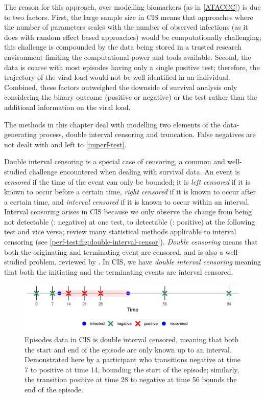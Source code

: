 \documentclass[thesis.tex]{subfiles}
\begin{document}
The reason for this approach, over modelling biomarkers (as in \autoref{ATACCC}) is due to two factors.
First, the large sample size in CIS means that approaches where the number of parameters scales with the number of observed infections (as it does with random effect based approaches) would be computationally challenging; this challenge is compounded by the data being stored in a trusted research environment limiting the computational power and tools available.
Second, the data is coarse with most episodes having only a single positive test; therefore, the trajectory of the viral load would not be well-identified in an individual.
Combined, these factors outweighed the downside of survival analysis only considering the binary outcome (\ie positive or negative) or the test rather than the additional information on the viral load.

The methods in this chapter deal with modelling two elements of the data-generating process, double interval censoring and truncation.
False negatives are not dealt with and left to \autoref{imperf-test}.

Double interval censoring is a special case of censoring, a common and well-studied challenge encountered when dealing with survival data.
An event is \emph{censored} if the time of the event can only be bounded; it is \emph{left censored} if it is known to occur before a certain time, \emph{right censored} if it is known to occur after a certain time, and \emph{interval censored} if it is known to occur within an interval.
Interval censoring arises in CIS because we only observe the change from being not detectable (\ie: negative) at one test, to detectable (\ie: positive) at the following test and vice versa; \textcite{bogaertsSurvival} review many statistical methods applicable to interval censoring (see \autoref{perf-test:fig:double-interval-censor}).
\emph{Double censoring} means that both the originating and terminating event are censored, and is also a well-studied problem, reviewed by \textcite{sunStatisticala}.
In CIS, we have \emph{double interval censoring} meaning that both the initiating and the terminating events are interval censored.
\begin{figure}
  \centering \includegraphics{cis-perfect-testing/double-interval-censor}
  \caption{Episodes data in CIS is double interval censored, meaning that both the start and end of the episode are only known up to an interval. Demonstrated here by a participant who transitions negative at time 7 to positive at time 14, bounding the start of the episode; similarly, the transition positive at time 28 to negative at time 56 bounds the end of the episode. \label{perf-test:fig:double-interval-censor}}
\end{figure}
\end{document}
